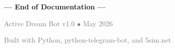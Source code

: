 \vspace{1cm}

\begin{center}
\Large\textbf{--- End of Documentation ---}

\vspace{0.5cm}
\normalsize
\textcolor{gray}{Active Dream Bot v1.0 $\bullet$ May 2026}

\textcolor{gray}{Built with Python, python-telegram-bot, and 5sim.net}
\end{center}
